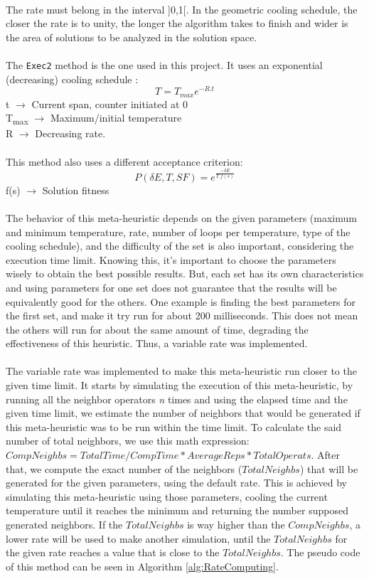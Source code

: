 \\
The rate must belong in the interval ]0,1[. In the geometric cooling schedule, the closer the rate is to unity, the longer the algorithm takes to finish and wider is the area of solutions to be analyzed in the solution space.\\
\\
The \verb+Exec2+ method is the one used in this project. It uses an exponential (decreasing) cooling schedule \cite{CarvalhoLisbonNovember2004}:\\
\[T = T_{max}e^{-R.t} \]
t $\rightarrow$ Current span, counter initiated at 0\\
T\textsubscript{max} $\rightarrow$ Maximum/initial temperature\\
R $\rightarrow$ Decreasing rate.\\
\\
This method also uses a different acceptance criterion:\\
\[P(\delta E, T, SF) = e^{\frac{-\delta E}{T.f(s)}} \]
f(s) $\rightarrow$ Solution fitness\\
\\
The behavior of this meta-heuristic depends on the given parameters (maximum and minimum temperature, rate, number of loops per temperature, type of the cooling schedule), and the difficulty of the set is also important, considering the execution time limit. Knowing this, it's important to choose the parameters wisely to obtain the best possible results. But, each set has its own characteristics and using parameters for one set does not guarantee that the results will be equivalently good for the others. One example is finding the best parameters for the first set, and make it try run for about 200 milliseconds. This does not mean the others will run for about the same amount of time, degrading the effectiveness of this heuristic. Thus, a variable rate was implemented.\\
\\
The variable rate was implemented to make this meta-heuristic run closer to the given time limit. It starts by simulating the execution of this meta-heuristic, by running all the neighbor operators \textit{n} times and using the elapsed time and the given time limit, we estimate the number of neighbors that would be generated if this meta-heuristic was to be run within the time limit. To calculate the said number of total neighbors, we use this math expression: $CompNeighbs = TotalTime / CompTime * AverageReps * TotalOperats$. After that, we compute the exact number of the neighbors ($TotalNeighbs$) that will be generated for the given parameters, using the default rate. This is achieved by simulating this meta-heuristic using those parameters, cooling the current temperature until it reaches the minimum and returning the number supposed generated neighbors. If the $TotalNeighbs$ is way higher than the $CompNeighbs$, a lower rate will be used to make another simulation, until the $TotalNeighbs$ for the given rate reaches a value that is close to the $TotalNeighbs$. The pseudo code of this method can be seen in Algorithm \ref{alg:RateComputing}.\\
